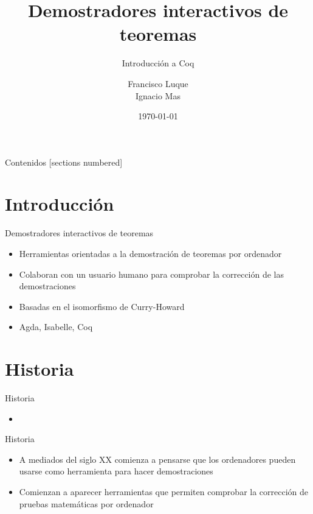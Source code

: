 \documentclass[10pt]{beamer}
\title{Demostradores interactivos de teoremas}
\subtitle{Introducción a Coq}
\date{\today}
\author{Francisco Luque \\ Ignacio Mas}
\institute{Universidad de Granada}
\begin{document}
\maketitle

\begin{frame}{Contenidos}
  [sections numbered]
  \tableofcontents[hideallsubsections]
\end{frame}

\section{Introducción}

\begin{frame}{Demostradores interactivos de teoremas}

  \begin{itemize}
  \item Herramientas orientadas a la demostración de teoremas por ordenador
  \item Colaboran con un usuario humano para comprobar la corrección de las demostraciones
  \item Basadas en el isomorfismo de Curry-Howard
  \item Agda, Isabelle, Coq
  \end{itemize}

\end{frame}

\section{Historia}

\begin{frame}{Historia}

  \begin{itemize}
  \item
  \end{itemize}

\end{frame}

\begin{frame}{Historia}

  \begin{itemize}
  \item A mediados del siglo XX comienza a pensarse que los ordenadores pueden
    usarse como herramienta para hacer demostraciones
  \item Comienzan a aparecer herramientas que permiten comprobar la corrección
    de pruebas matemáticas por ordenador
  \end{itemize}

\end{frame}
\end{document}
